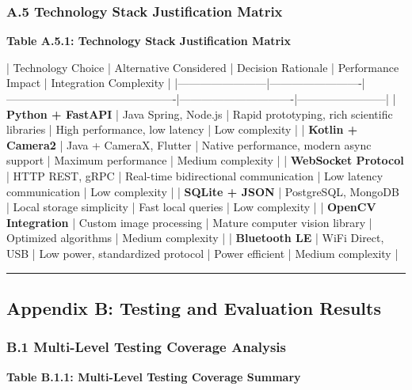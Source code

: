 \documentclass[11pt,a4paper]{article}
\begin{document}
\subsubsection{A.5 Technology Stack Justification Matrix}

\textbf{Table A.5.1: Technology Stack Justification Matrix}

| Technology Choice      | Alternative Considered  | Decision Rationale                           | Performance Impact            | Integration Complexity |
|------------------------|-------------------------|----------------------------------------------|-------------------------------|------------------------|
| \textbf{Python + FastAPI}   | Java Spring, Node.js    | Rapid prototyping, rich scientific libraries | High performance, low latency | Low complexity         |
| \textbf{Kotlin + Camera2}   | Java + CameraX, Flutter | Native performance, modern async support     | Maximum performance           | Medium complexity      |
| \textbf{WebSocket Protocol} | HTTP REST, gRPC         | Real-time bidirectional communication        | Low latency communication     | Low complexity         |
| \textbf{SQLite + JSON}      | PostgreSQL, MongoDB     | Local storage simplicity                     | Fast local queries            | Low complexity         |
| \textbf{OpenCV Integration} | Custom image processing | Mature computer vision library               | Optimized algorithms          | Medium complexity      |
| \textbf{Bluetooth LE}       | WiFi Direct, USB        | Low power, standardized protocol             | Power efficient               | Medium complexity      |

\hrule

\subsection{Appendix B: Testing and Evaluation Results}

\subsubsection{B.1 Multi-Level Testing Coverage Analysis}

\textbf{Table B.1.1: Multi-Level Testing Coverage Summary}
\end{document}
